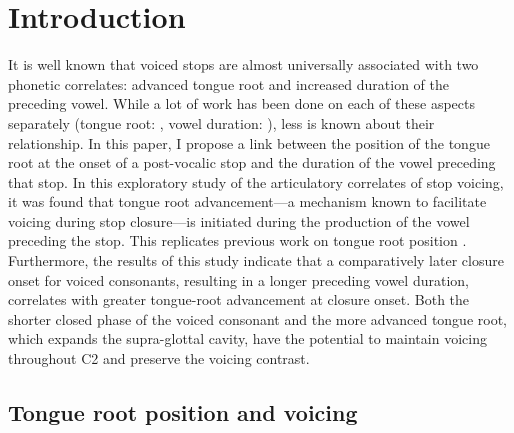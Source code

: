\documentclass[preprint]{JASAnew}
\begin{document}

\maketitle




\hypertarget{introduction}{%
\section{Introduction}\label{introduction}}

\label{s:intro}

It is well known that voiced stops are almost universally associated
with two phonetic correlates: advanced tongue root and increased
duration of the preceding vowel. While a lot of work has been done on
each of these aspects separately (tongue root:
\citealt{kent1969, perkell1969, westbury1983, rothenberg1967, ahn2018},
vowel duration:
\citealt{house1953, peterson1960, chen1970, klatt1973, lisker1974, farnetani1986, fowler1992}),
less is known about their relationship. In this paper, I propose a link
between the position of the tongue root at the onset of a post-vocalic
stop and the duration of the vowel preceding that stop. In this
exploratory study of the articulatory correlates of stop voicing, it was
found that tongue root advancement---a mechanism known to facilitate
voicing during stop closure---is initiated during the production of the
vowel preceding the stop. This replicates previous work on tongue root
position
\citep{kent1969, perkell1969, westbury1983, rothenberg1967, ahn2018}.
Furthermore, the results of this study indicate that a comparatively
later closure onset for voiced consonants, resulting in a longer
preceding vowel duration, correlates with greater tongue-root
advancement at closure onset. Both the shorter closed phase of the
voiced consonant and the more advanced tongue root, which expands the
supra-glottal cavity, have the potential to maintain voicing throughout
C2 and preserve the voicing contrast.

\hypertarget{tongue-root-position-and-voicing}{%
\subsection{Tongue root position and
voicing}\label{tongue-root-position-and-voicing}}
\end{document}
